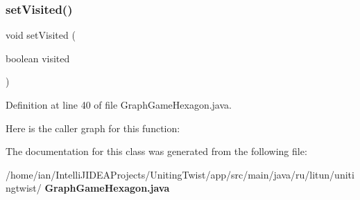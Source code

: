 \subsubsection{set\+Visited()}
{\footnotesize\ttfamily void set\+Visited (\begin{DoxyParamCaption}\item[{boolean}]{visited }\end{DoxyParamCaption})}



Definition at line 40 of file Graph\+Game\+Hexagon.\+java.

Here is the caller graph for this function\+:


The documentation for this class was generated from the following file\+:\begin{DoxyCompactItemize}
\item 
/home/ian/\+Intelli\+J\+I\+D\+E\+A\+Projects/\+Uniting\+Twist/app/src/main/java/ru/litun/unitingtwist/\textbf{ Graph\+Game\+Hexagon.\+java}\end{DoxyCompactItemize}
